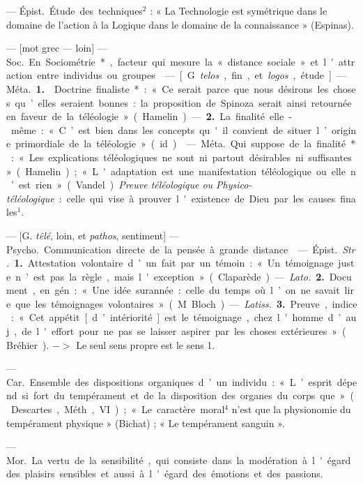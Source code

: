 \begin{itemize}[leftmargin=1cm, label=, itemsep=1pt]
 — \si{Épist.} Étude des techniques$^2$ : « La Technologie
est symétrique dans le domaine de l’action à la Logique dans le domaine de la
connaissance » (Espinas).

 — [mot grec — loin] — \si{Soc.} En Sociométrie*, facteur qui mesure
la « distance sociale » et l'attraction entre individus ou groupes.

 — [G. {\it telos}, fin, et {\it logos}, étude] — \si{Méta.}
{\bf 1.}  Doctrine finaliste* : « Ce serait parce que nous
désirons les choses qu’elles seraient bonnes : la proposition de Spinoza
serait ainsi retournée en faveur de la téléologie » (Hamelin). — {\bf 2.} La
finalité elle-même : « C’est bien dans les concepts qu'il convient de situer
l’origine primordiale de la téléologie » (id.).

 — \si{Méta.} Qui suppose de la finalité* : « Les
explications téléologiques ne sont ni partout désirables ni suffisantes
» (Hamelin) ; « L'adaptation est une manifestation téléologique ou elle n’est
rien »
(Vandel). {\it Preuve téléologique ou Physico-téléologique} : celle qui vise
à prouver l'existence de Dieu par les causes finales$^1$.

 — [G. {\it têlé}, loin, et {\it pathos}, sentiment] —
\si{Psycho.} Communication directe de la pensée à grande distance.

 — \si{Épist.} {\it Str.} {\bf 1.} Attestation volontaire d’un
fait par un témoin : « Un témoignage juste n’est pas la règle, mais
l'exception » (Claparède). — {\it Lato.} {\bf 2.} Document, en gén. : « Une
idée surannée : celle du temps où l’on ne savait lire que les témoignages
volontaires » (M. Bloch). — {\it Latiss.} {\bf 3.} Preuve, indice : « Cet
appétit [d’intériorité] est le témoignage, chez l’homme d’auj., de l'effort
pour ne pas se laisser aspirer par les choses extérieures » (Bréhier). $->$
Le seul sens propre est le sens 1.

 — \si{Car.} Ensemble des dispositions organiques d’un
individu : « L’esprit dépend si fort du tempérament et de la disposition des
organes du corps que... » (Descartes, Méth., VI) ; « Le caractère moral$^4$
n’est que la physionomie du tempérament physique » (Bichat) ; « Le
tempérament sanguin ».

 — \si{Mor.} La vertu de la sensibilité, qui consiste dans la
modération à l'égard des plaisirs sensibles et aussi à l'égard des émotions
et des passions.


\end{itemize}
